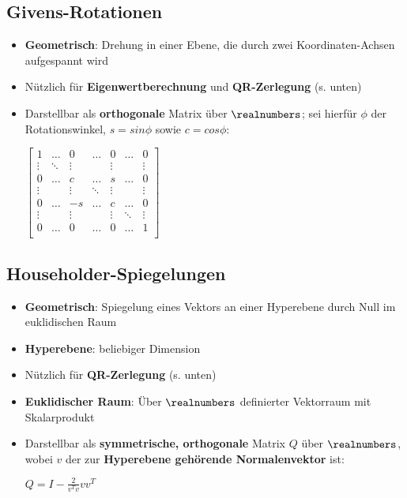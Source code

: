 \subsection{Givens-Rotationen}%
\label{gl:sub:givens-rotationen}
\begin{itemize}
	\item \textbf{Geometrisch}: Drehung in einer Ebene, die durch zwei Koordinaten-Achsen aufgespannt wird
	\item Nützlich für \textbf{Eigenwertberechnung} und \textbf{QR-Zerlegung} (s. unten)
	\item Darstellbar als \textbf{orthogonale} Matrix über $\realnumbers$; sei hierfür $\phi$ der Rotationswinkel, $s = sin \phi$ sowie $ c = cos \phi$:
	\begin{center}
		$\begin{bmatrix}
			1 		& \dots 	& 0 	 & \dots 	& 0 	 & \dots 	& 0 	 \\
			\vdots 	& \ddots 	& \vdots & 		 	& \vdots &  	 	& \vdots \\
			0 		& \dots 	& c 	 & \dots 	& s 	 & \dots 	& 0 	 \\
			\vdots 	&			& \vdots & \ddots 	& \vdots &  	 	& \vdots \\
			0 		& \dots 	& -s 	 & \dots 	& c 	 & \dots 	& 0 	 \\
			\vdots 	&			& \vdots & 		 	& \vdots & \ddots 	& \vdots \\
			0 		& \dots 	& 0 	 & \dots 	& 0 	 & \dots 	& 1 	 \\
		\end{bmatrix}$
	\end{center}
\end{itemize}

\subsection{Householder-Spiegelungen}%
\label{gl:sub:householder-spiegelungen}
\begin{itemize}
	\item \textbf{Geometrisch}: Spiegelung eines Vektors an einer Hyperebene durch Null im euklidischen Raum
	\item \textbf{Hyperebene}:  beliebiger Dimension
	\item Nützlich für \textbf{QR-Zerlegung} (s. unten)
	\item \textbf{Euklidischer Raum}: Über $\realnumbers$ definierter Vektorraum mit Skalarprodukt
	\item Darstellbar als \textbf{symmetrische, orthogonale} Matrix $Q$ über $\realnumbers$, wobei $v$ der zur \textbf{Hyperebene gehörende Normalenvektor} ist:
	\begin{center}
		$Q = I - \frac{2}{v^Tv}vv^T$
	\end{center}
\end{itemize}